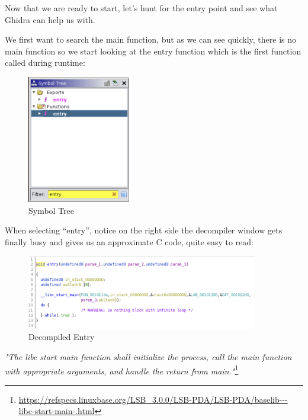 \documentclass{article}
\begin{document}
\noindent\linebreak
Now that we are ready to start, let’s hunt for the entry point and see what Ghidra can help us with.

\noindent\linebreak
We first want to search the main function, but as we can see quickly, there is no main function so we start 
looking at the entry function which is the first function called during runtime:
\begin{figure}[H]
\centering
\includegraphics[width=0.4\textwidth]{img/ghidra_2.jpg}
\caption{Symbol Tree}
\label{fig:ghidra_2}
\end{figure}

\noindent\linebreak
When selecting “entry”, notice on the right side the decompiler window gets finally busy and gives us an 
approximate C code, quite easy to read:
\begin{figure}[H]
\centering
\includegraphics[width=0.9\textwidth]{img/ghidra_3.jpg}
\caption{Decompiled Entry}
\label{fig:ghidra_3}
\end{figure}

\noindent\linebreak
\textit{"The libc start main function shall initialize the process, call the main function with appropriate 
arguments, and handle the return from main."}\footnote{\url{https://refspecs.linuxbase.org/LSB_3.0.0/LSB-PDA/LSB-PDA/baselib---libc-start-main-.html}}
\end{document}
